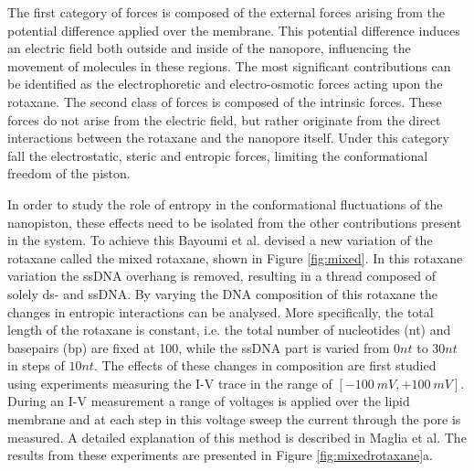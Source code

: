 The first category of forces is composed of the external forces arising from the
potential difference applied over the membrane. This potential difference induces an
electric field both outside and inside of the nanopore, influencing the movement of
molecules in these regions. The most significant contributions can be identified as the
electrophoretic and electro-osmotic forces acting upon the rotaxane. The second class of
forces is composed of the intrinsic forces. These forces do not arise from the
electric field, but rather originate from the direct interactions between the rotaxane
and the nanopore itself. Under this category fall the electrostatic, steric and entropic
forces, limiting the conformational freedom of the piston.

In order to study the role of entropy in the conformational fluctuations of
the nanopiston, these effects need to be isolated from the other contributions present in
the system. To achieve this Bayoumi et al.\cite{Bayoumi21} devised a new variation of the
rotaxane
called the mixed rotaxane, shown in Figure \ref{fig:mixed}. In this rotaxane variation
the ssDNA overhang is removed, resulting
in a thread composed of solely ds- and ssDNA. By varying the DNA composition of this
rotaxane the changes in entropic interactions can be analysed. More specifically, the
total length of the rotaxane is constant, i.e. the total number of nucleotides (nt) and
basepairs (bp) are fixed at 100, while the ssDNA part is varied from $0nt$ to $30 nt$ in
steps of $10nt$. The effects of these changes in composition are first studied using
experiments measuring the I-V
trace in the range of $[-100\ mV, +100\ mV]$. During an I-V measurement a range of
voltages is applied over the lipid membrane and at each step in this voltage sweep the
current through the pore is measured. A detailed explanation of this method is described
in Maglia et al.\cite{MAGLIA2010591} The results from these experiments are presented in
Figure \ref{fig:mixedrotaxane}a.

